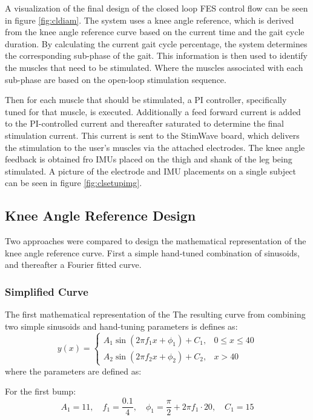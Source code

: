A visualization of the final design of the closed loop FES control flow can be seen in figure \ref{fig:cldiam}. The system uses a knee angle reference, which is derived from the knee angle reference curve based on the current time and the gait cycle duration. By calculating the current gait cycle percentage, the system determines the corresponding sub-phase of the gait. This information is then used to identify the muscles that need to be stimulated. Where the muscles associated with each sub-phase are based on the open-loop stimulation sequence. 

Then for each muscle that should be stimulated, a PI controller, specifically tuned for that muscle, is executed. Additionally a feed forward current is added to the PI-controlled current and thereafter saturated to determine the final stimulation current. This current is sent to the StimWave board, which delivers the stimulation to the user's muscles via the attached electrodes. The knee angle feedback is obtained fro IMUs placed on the thigh and shank of the leg being stimulated. A picture of the electrode and IMU placements on a single subject can be seen in figure \ref{fig:clsetupimg}.

\subsection{Knee Angle Reference Design}
Two approaches were compared to design the mathematical representation of the knee angle reference curve. First a simple hand-tuned combination of sinusoids, and thereafter a Fourier fitted curve.
\subsubsection{Simplified Curve}
The first mathematical representation of the
The resulting curve from combining two simple sinusoids and hand-tuning parameters is defines as:
\[
y(x) =
\begin{cases}
A_1 \sin\left(2 \pi f_1 x + \phi_1\right) + C_1, & 0 \leq x \leq 40 \\
A_2 \sin\left(2 \pi f_2 x + \phi_2\right) + C_2, & x > 40
\end{cases}
\]
where the parameters are defined as:

For the first bump:
\[
A_1 = 11, \quad f_1 = \frac{0.1}{4}, \quad \phi_1 = \frac{\pi}{2} + 2\pi f_1 \cdot 20, \quad C_1 = 15
\]

